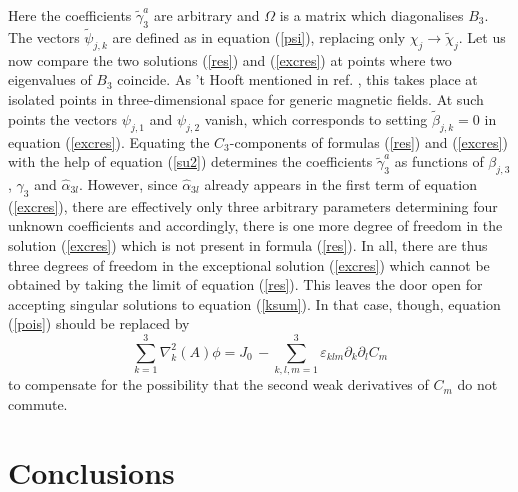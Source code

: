 \documentclass[a4paper,12pt]{article}
\begin{document}
Here the coefficients $\widetilde{\gamma}_3^a$ are arbitrary and $\Omega$ is a matrix which diagonalises $B_3$. The vectors $\widetilde{\psi}_{j,k}$ are defined as in equation (\ref{psi}), replacing only $\chi_j \rightarrow \widetilde{\chi}_j$. Let us now compare the two solutions (\ref{res}) and (\ref{excres}) at points where two eigenvalues of $B_3$ coincide. As 't Hooft mentioned in ref. \cite{th}, this takes place at isolated points in three-dimensional space for generic magnetic fields. At such points the vectors $\psi_{j,1}$ and $\psi_{j,2}$ vanish, which corresponds to setting $\widetilde{\beta}_{j,k} = 0$ in equation (\ref{excres}). Equating the $C_3$-components of formulas (\ref{res}) and (\ref{excres}) with the help of equation (\ref{su2}) determines the coefficients $\widetilde{\gamma}_3^a$ as functions of $\beta_{j,3}$, $\gamma_3$ and $\widehat{\alpha}_{3l}$. However, since $\widehat{\alpha}_{3l}$ already appears in the first term of equation (\ref{excres}), there are effectively only three arbitrary parameters determining four unknown coefficients and accordingly, there is one more degree of freedom in the solution (\ref{excres}) which is not present in formula (\ref{res}). In all, there are thus three degrees of freedom in the exceptional solution (\ref{excres}) which cannot be obtained by taking the limit of equation (\ref{res}). This leaves the door open for accepting singular solutions to equation (\ref{ksum}). In that case, though, equation (\ref{pois}) should be replaced by
$$ \sum_{k=1}^3 \nabla_k^2(A) \phi = J_0 \, - \!\! \sum_{k,l,m=1}^3 \! \varepsilon_{klm} \partial_k \partial_l C_m $$
to compensate for the possibility that the second weak derivatives of $C_m$ do not commute.
 
\section{Conclusions}
\end{document}
